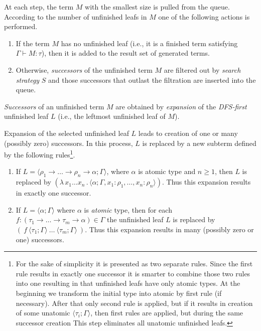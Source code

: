 \documentclass[conference]{IEEEtran}
\newcommand{\tur}[3]{#1\vdash{}#2 \colon #3}
\newcommand{\lamb}[2]{( \lambda \, #1 \, . \, #2 )}
\newcommand{\ar}{\rightarrow\xspace}
\newcommand{\ul}[2]{\langle #1 ; #2 \rangle}
\newcommand{\red}[1]{{\color{red} #1}}
\begin{document}
At each step, the term $M$ with the smallest size
is pulled from the queue.
According to the number of unfinished leafs in $M$ one of
the following actions is performed.
\begin{enumerate}
 \item If the term $M$ has no unfinished leaf (i.e., it is a finished
 term satisfying \mbox{$\tur{\Gamma}{M}{\tau}$}), then it is added to the
 result set
 of generated terms.   
 \item Otherwise, \textit{successors} of the unfinished term $M$ are
       filtered out by \textit{search strategy} $S$ and
       those successors that outlast the filtration 
       are inserted into the queue.
\end{enumerate}

\textit{Successors} of an unfinished term $M$ are obtained by 
\textit{expansion} of the \mbox{\textit{DFS-first}} unfinished leaf $L$
(i.e., the leftmost unfinished leaf of $M$).

Expansion of the selected unfinished leaf $L$ leads to creation of 
one or many (possibly zero) successors.
In this process, $L$ is replaced
by a new subterm defined by the following rules\footnote{
For the sake of simplicity it is presented as two separate rules. 
Since the first rule results in exactly one successor it is smarter
to combine those two rules into one resulting in that unfinished leafs
have only atomic types. At the beginning we transform the initial type into atomic by first rule (if necessary). After that
only second rule is applied, but if it results in creation of some unatomic 
$\ul{\tau_i}{\Gamma}$, then first rules are applied, but during the same successor creation This step eliminates all unatomic unfinished leafs. }.
\begin{enumerate}
 \item If $L = \ul{\rho_1 \ar \dots \ar \rho_n \ar \alpha}{\Gamma}$,
 	   where $\alpha$ is atomic type and $n \geq 1$, 
       then $L$ is replaced by 
       $\lamb{x_1 \dots x_n}{\ul{\alpha}
       {\Gamma,x_1 \colon \rho_1,\dots,x_n \colon \rho_n}}$.
       Thus this expansion results in exactly one successor.  
 \item If $L = \ul{\alpha}{\Gamma}$ where $\alpha$ is \textit{atomic} type,
       then for each 
       \mbox{$f : (\tau_1 \ar \dots \ar \tau_m \ar \alpha) \in \Gamma$}
       the unfinished leaf $L$ is replaced by 
       $(~f~\ul{\tau_1}{\Gamma}~\dots~\ul{\tau_m}{\Gamma}~)$.
       Thus this expansion results in many (possibly zero or one) successors.
\end{enumerate}
\end{document}
